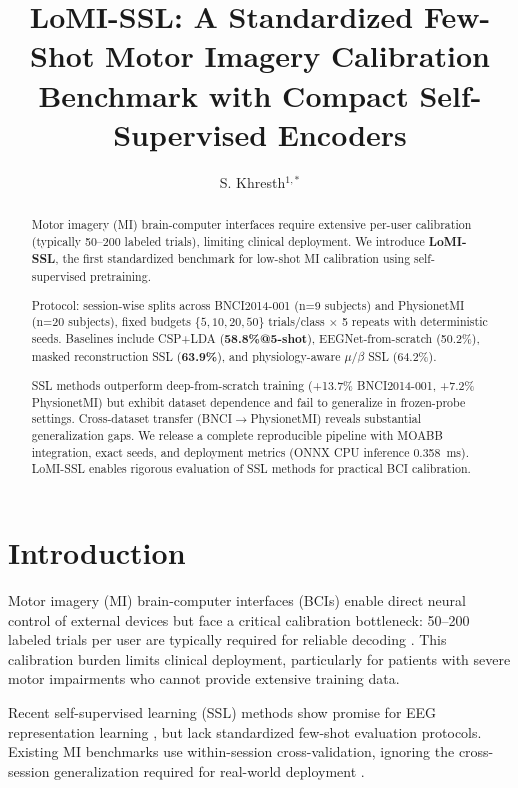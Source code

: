 \documentclass{iopjournal}
\begin{document}
\title{LoMI-SSL: A Standardized Few-Shot Motor Imagery Calibration Benchmark with Compact Self-Supervised Encoders}

\author{S. Khresth$^{1,*}$}

\begin{abstract}
Motor imagery (MI) brain-computer interfaces require extensive per-user calibration (typically 50--200 labeled trials), limiting clinical deployment. We introduce \textbf{LoMI-SSL}, the first standardized benchmark for low-shot MI calibration using self-supervised pretraining. 

Protocol: session-wise splits across BNCI2014-001 (n=9 subjects) and PhysionetMI (n=20 subjects), fixed budgets $\{5,10,20,50\}$ trials/class $\times$ 5 repeats with deterministic seeds. Baselines include CSP+LDA (\textbf{58.8\%@5-shot}), EEGNet-from-scratch (50.2\%), masked reconstruction SSL (\textbf{63.9\%}), and physiology-aware $\mu$/$\beta$ SSL (64.2\%).

SSL methods outperform deep-from-scratch training (+13.7\% BNCI2014-001, +7.2\% PhysionetMI) but exhibit dataset dependence and fail to generalize in frozen-probe settings. Cross-dataset transfer (BNCI$\rightarrow$PhysionetMI) reveals substantial generalization gaps. We release a complete reproducible pipeline with MOABB integration, exact seeds, and deployment metrics (ONNX CPU inference \SI{0.358}{\milli\second}). LoMI-SSL enables rigorous evaluation of SSL methods for practical BCI calibration.
\end{abstract}

\section{Introduction}

Motor imagery (MI) brain-computer interfaces (BCIs) enable direct neural control of external devices but face a critical calibration bottleneck: 50--200 labeled trials per user are typically required for reliable decoding \cite{lotte2018review}. This calibration burden limits clinical deployment, particularly for patients with severe motor impairments who cannot provide extensive training data.

Recent self-supervised learning (SSL) methods show promise for EEG representation learning \cite{banville2021self}, but lack standardized few-shot evaluation protocols. Existing MI benchmarks use within-session cross-validation, ignoring the cross-session generalization required for real-world deployment \cite{vandecappelle2022moabb}.
\end{document}
